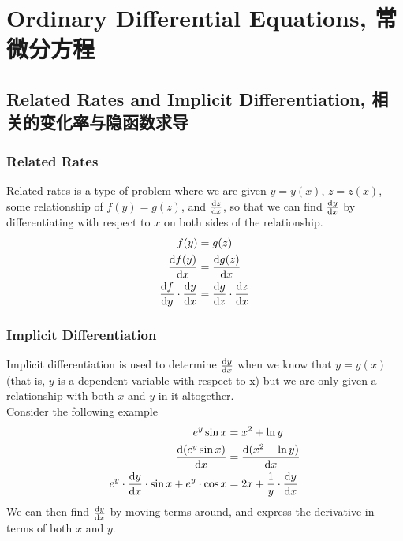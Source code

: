 \section{Ordinary Differential Equations, 常微分方程}

\subsection{Related Rates and Implicit Differentiation, 相关的变化率与隐函数求导}
\subsubsection{Related Rates}
Related rates is a type of problem where we are given $y = y(x)$, $z = z(x)$, some relationship of $f(y) = g(z)$, and $\dv{z}{x}$, so that we can find $\dv{y}{x}$ by differentiating with respect to $x$ on both sides of the relationship.
\begin{align*}
    f(y) &= g(z) \\
    \dv{f(y)}{x} &= \dv{g(z)}{x} \\
    \dv{f}{y} \cdot \dv{y}{x} &= \dv{g}{z} \cdot \dv{z}{x}
\end{align*}
\subsubsection{Implicit Differentiation}
Implicit differentiation is used to determine $\dv{y}{x}$ when we know that $y = y(x)$ (that is, $y$ is a dependent variable with respect to x) but we are only given a relationship with both $x$ and $y$ in it altogether. \\
Consider the following example
\begin{align*}
    e^y\sin{x} &= x^2 + \ln{y} \\
    \dv{(e^y\sin{x})}{x} &= \dv{(x^2 + \ln{y})}{x} \\
    e^y \cdot \dv{y}{x} \cdot \sin{x} + e^y \cdot \cos{x} &= 2x + \frac{1}{y} \cdot \dv{y}{x}
\end{align*}
We can then find $\dv{y}{x}$ by moving terms around, and express the derivative in terms of both $x$ and $y$.

